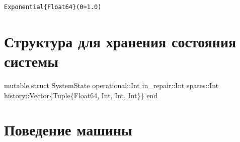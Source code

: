 \documentclass[
  12pt,
  a4paper,
  DIV=11,
  numbers=noendperiod]{scrreprt}
\newenvironment{Shaded}{\begin{snugshade}}{\end{snugshade}}
\newcommand{\DataTypeTok}[1]{\textcolor[rgb]{0.68,0.00,0.00}{#1}}
\newcommand{\KeywordTok}[1]{\textcolor[rgb]{0.00,0.23,0.31}{#1}}
\newcommand{\NormalTok}[1]{\textcolor[rgb]{0.00,0.23,0.31}{#1}}
\newcommand{\OperatorTok}[1]{\textcolor[rgb]{0.37,0.37,0.37}{#1}}
\begin{document}
\begin{verbatim}
Exponential{Float64}(θ=1.0)
\end{verbatim}

\section{Структура для хранения состояния
системы}\label{ux441ux442ux440ux443ux43aux442ux443ux440ux430-ux434ux43bux44f-ux445ux440ux430ux43dux435ux43dux438ux44f-ux441ux43eux441ux442ux43eux44fux43dux438ux44f-ux441ux438ux441ux442ux435ux43cux44b}

\begin{Shaded}
\begin{Highlighting}[]
\KeywordTok{mutable struct}\NormalTok{ SystemState}
\NormalTok{    operational}\OperatorTok{::}\DataTypeTok{Int}
\NormalTok{    in\_repair}\OperatorTok{::}\DataTypeTok{Int}
\NormalTok{    spares}\OperatorTok{::}\DataTypeTok{Int}
\NormalTok{    history}\OperatorTok{::}\DataTypeTok{Vector\{Tuple\{Float64, Int, Int, Int\}\}}
\KeywordTok{end}
\end{Highlighting}
\end{Shaded}

\section{Поведение
машины}\label{ux43fux43eux432ux435ux434ux435ux43dux438ux435-ux43cux430ux448ux438ux43dux44b}
\end{document}
